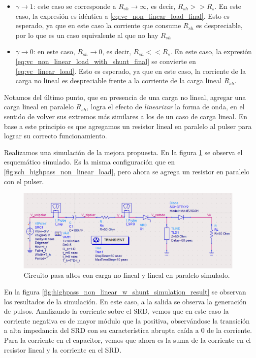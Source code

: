 \begin{itemize}
    \item $\gamma \to 1$: este caso se corresponde a $R_{sh} \to \infty$, es
        decir, $R_{sh} >> R_s$. En este caso, la expresión es idéntica a
        \ref{eq:vc_non_linear_load_final}. Esto es esperado, ya que en este caso
        la corriente que consume $R_{sh}$ es despreciable, por lo que es un caso
        equivalente al que no hay $R_{sh}$
    \item $\gamma \to 0$: en este caso, $R_{sh} \to 0$, es decir, $R_{sh} <<
        R_s$. En este caso, la expresión
        \ref{eq:vc_non_linear_load_with_shunt_final} se convierte en
        \ref{eq:vc_linear_load}. Esto es esperado, ya que en este caso, la
        corriente de la carga no lineal es despreciable frente a la corriente
        de la carga lineal $R_{sh}$.
\end{itemize}

Notamos del último punto, que en presencia de una carga no lineal, agregar una
carga lineal en paralelo $R_{sh}$, logra el efecto de \textit{linearizar} la
forma de onda, en el sentido de volver sus extremos más similares a los de un
caso de carga lineal.  En base a este principio es que agregamos un resistor
lineal en paralelo al pulser para lograr su correcto funcionamiento.

Realizamos una simulación de la mejora propuesta. En la figura
\ref{fig:sch_highpass_non_linear_w_shunt_simulation} se observa el esquemático
simulado. Es la misma configuración que en
\ref{fig:sch_highpass_non_linear_load}, pero ahora se  agrega un resistor en
paralelo con el pulser.

\begin{figure}[tbp]
    \centering
    \includegraphics[width=\textwidth]{images/highpass_nonlinear_w_shunt_sch.png}
    \caption{Circuito pasa altos con carga no lineal y lineal en paralelo
    simulado.}
    \label{fig:sch_highpass_non_linear_w_shunt_simulation}
\end{figure}

En la figura \ref{fig:highpass_non_linear_w_shunt_simulation_result} se observan
los resultados de la simulación. En este caso, a la salida se observa la
generación de pulsos. Analizando la corriente sobre el SRD, vemos que en este
caso la corriente negativa es de mayor módulo que la positiva, observándose la
transición a alta impedancia del SRD con su característica abrupta caída a $0$
de la corriente. Para la corriente en el capacitor, vemos que ahora es la suma
de la corriente en el resistor lineal y la corriente en el SRD.

